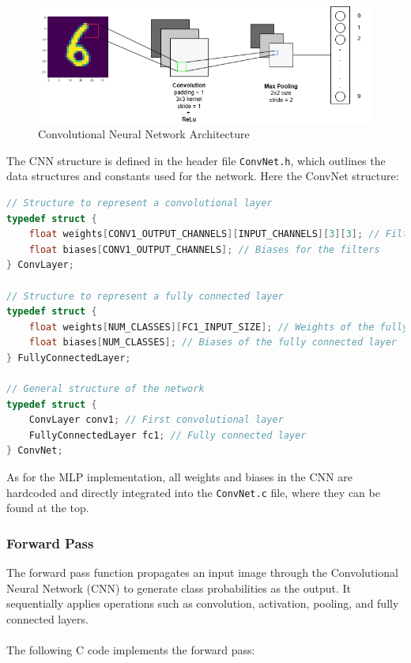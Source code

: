 \documentclass{article}
\begin{document}
\begin{figure}[H]
    \centering
    \includegraphics[width=1\textwidth]{./assets/ConvNet/convNet.png}
    \caption{Convolutional Neural Network Architecture}
    \label{fig:convolutional-neural-network}
\end{figure}


The CNN structure is defined in the header file \texttt{ConvNet.h}, which outlines the data structures and constants used for the network. Here the ConvNet structure:

\begin{lstlisting}[language=C]
// Structure to represent a convolutional layer
typedef struct {
    float weights[CONV1_OUTPUT_CHANNELS][INPUT_CHANNELS][3][3]; // Filters of the convolutional layer 
    float biases[CONV1_OUTPUT_CHANNELS]; // Biases for the filters
} ConvLayer;

// Structure to represent a fully connected layer
typedef struct {
    float weights[NUM_CLASSES][FC1_INPUT_SIZE]; // Weights of the fully connected layer
    float biases[NUM_CLASSES]; // Biases of the fully connected layer
} FullyConnectedLayer;

// General structure of the network
typedef struct {
    ConvLayer conv1; // First convolutional layer
    FullyConnectedLayer fc1; // Fully connected layer
} ConvNet;
\end{lstlisting}

As for the MLP implementation, all weights and biases in the CNN are hardcoded and directly integrated into the \texttt{ConvNet.c} file, where they can be found at the top.

\subsubsection{Forward Pass}
The forward pass function propagates an input image through the Convolutional Neural Network (CNN) to generate class probabilities as the output. It sequentially applies operations such as convolution, activation, pooling, and fully connected layers.
\\\\The following C code implements the forward pass:
\end{document}
